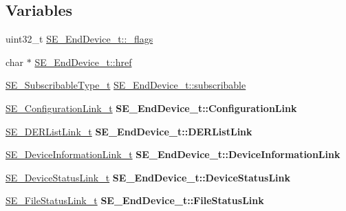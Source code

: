 \subsection*{Variables}
\begin{DoxyCompactItemize}
\item 
uint32\+\_\+t \hyperlink{group__EndDevice_ga11e4a5d3538ec472aa2342848487245d}{S\+E\+\_\+\+End\+Device\+\_\+t\+::\+\_\+flags}
\item 
char $\ast$ \hyperlink{group__EndDevice_ga268aeabad7fb9b0e83e5e354dd06f37f}{S\+E\+\_\+\+End\+Device\+\_\+t\+::href}
\item 
\hyperlink{group__SubscribableType_ga5c41f553d369710ed34619266bf2551e}{S\+E\+\_\+\+Subscribable\+Type\+\_\+t} \hyperlink{group__EndDevice_gaa4656eb793a41a2d41ddb4708c236471}{S\+E\+\_\+\+End\+Device\+\_\+t\+::subscribable}
\item 
\mbox{\label{group__EndDevice_ga76ac00d20a0aa2362cde43b74c51945f}} 
\hyperlink{structSE__ConfigurationLink__t}{S\+E\+\_\+\+Configuration\+Link\+\_\+t} {\bfseries S\+E\+\_\+\+End\+Device\+\_\+t\+::\+Configuration\+Link}
\item 
\mbox{\label{group__EndDevice_gadaa4697d51711373958bf6766ba09331}} 
\hyperlink{structSE__DERListLink__t}{S\+E\+\_\+\+D\+E\+R\+List\+Link\+\_\+t} {\bfseries S\+E\+\_\+\+End\+Device\+\_\+t\+::\+D\+E\+R\+List\+Link}
\item 
\mbox{\label{group__EndDevice_gad6de7b7786f72427881fa21872976cf2}} 
\hyperlink{structSE__DeviceInformationLink__t}{S\+E\+\_\+\+Device\+Information\+Link\+\_\+t} {\bfseries S\+E\+\_\+\+End\+Device\+\_\+t\+::\+Device\+Information\+Link}
\item 
\mbox{\label{group__EndDevice_ga0c88587734d2031661e46076d12f8835}} 
\hyperlink{structSE__DeviceStatusLink__t}{S\+E\+\_\+\+Device\+Status\+Link\+\_\+t} {\bfseries S\+E\+\_\+\+End\+Device\+\_\+t\+::\+Device\+Status\+Link}
\item 
\mbox{\label{group__EndDevice_ga0507abff52b6f8414948b15aa6119260}} 
\hyperlink{structSE__FileStatusLink__t}{S\+E\+\_\+\+File\+Status\+Link\+\_\+t} {\bfseries S\+E\+\_\+\+End\+Device\+\_\+t\+::\+File\+Status\+Link}
\item 
\mbox{\label{group__EndDevice_gad6febfc1d0e4e0fd4b2ce8abb754f3c8}} 

\end{DoxyCompactItemize}
